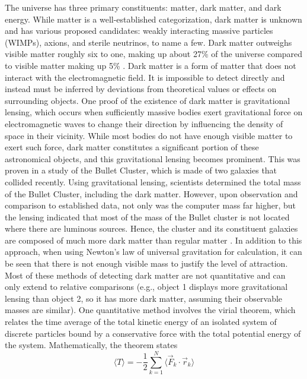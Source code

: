 \documentclass[12pt]{article}
\begin{document}
The universe has three primary constituents: matter, dark matter, and dark energy. While matter is a well-established categorization, dark matter is unknown and has various proposed candidates: weakly interacting massive particles (WIMPs), axions, and sterile neutrinos, to name a few. Dark matter outweighs visible matter roughly six to one, making up about 27\% of the universe compared to visible matter making up 5\% \cite{CERN2023}. Dark matter is a form of matter that does not interact with the electromagnetic field. It is impossible to detect directly and instead must be inferred by deviations from theoretical values or effects on surrounding objects. One proof of the existence of dark matter is gravitational lensing, which occurs when sufficiently massive bodies exert gravitational force on electromagnetic waves to change their direction by influencing the density of space in their vicinity. While most bodies do not have enough visible matter to exert such force, dark matter constitutes a significant portion of these astronomical objects, and this gravitational lensing becomes prominent.
This was proven in a study of the Bullet Cluster, which is made of two galaxies that collided recently. Using gravitational lensing, scientists determined the total mass of the Bullet Cluster, including the dark matter. However, upon observation and comparison to established data, not only was the computer mass far higher, but the lensing indicated that most of the mass of the Bullet cluster is not located where there are luminous sources. Hence, the cluster and its constituent galaxies are composed of much more dark matter than regular matter \cite{Sanford}\cite{Bhathe2021DarkMatter}. In addition to this approach, when using Newton's law of universal gravitation for calculation, it can be seen that there is not enough visible mass to justify the level of attraction. Most of these methods of detecting dark matter are not quantitative and can only extend to relative comparisons (e.g., object 1 displays more gravitational lensing than object 2, so it has more dark matter, assuming their observable masses are similar). One quantitative method involves the virial theorem, which relates the time average of the total kinetic energy of an isolated system of discrete particles bound by a conservative force with the total potential energy of the system. Mathematically, the theorem states
\begin{equation} \label{eq:virial}
\langle T \rangle = -\frac{1}{2} \sum_{k=1}^{N} 
 \langle \vec{F}_k \cdot \vec{r}_k \rangle
\end{equation}
\end{document}
